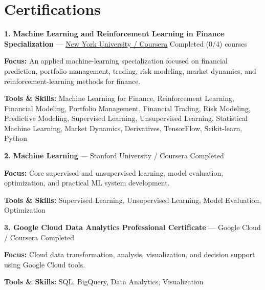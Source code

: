 \documentclass[9pt,letterpaper]{extarticle}
\begin{document}
\section{Certifications}
\noindent\textbf{1. Machine Learning and Reinforcement Learning in Finance Specialization} {\small --- \textcolor{blue}{\underline{\href{https://www.coursera.org/specializations/machine-learning-reinforcement-finance}{New York University / Coursera}}} \textbar{} Completed (0/4) courses}\par
\textbf{Focus:} An applied machine-learning specialization focused on financial prediction, portfolio management, trading, risk modeling, market dynamics, and reinforcement-learning methods for finance.\par
{\small\textbf{Tools \& Skills:} Machine Learning for Finance, Reinforcement Learning, Financial Modeling, Portfolio Management, Financial Trading, Risk Modeling, Predictive Modeling, Supervised Learning, Unsupervised Learning, Statistical Machine Learning, Market Dynamics, Derivatives, TensorFlow, Scikit-learn, Python\par}
\vspace{2pt}
\noindent\textbf{2. Machine Learning} {\small --- Stanford University / Coursera \textbar{} Completed}\par
\textbf{Focus:} Core supervised and unsupervised learning, model evaluation, optimization, and practical ML system development.\par
{\small\textbf{Tools \& Skills:} Supervised Learning, Unsupervised Learning, Model Evaluation, Optimization\par}
\vspace{2pt}
\noindent\textbf{3. Google Cloud Data Analytics Professional Certificate} {\small --- Google Cloud / Coursera \textbar{} Completed}\par
\textbf{Focus:} Cloud data transformation, analysis, visualization, and decision support using Google Cloud tools.\par
{\small\textbf{Tools \& Skills:} SQL, BigQuery, Data Analytics, Visualization\par}
\vspace{2pt}
\end{document}
